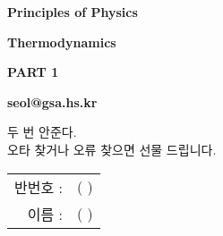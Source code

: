 \begin{titlepage}
  \centering
  \vspace*{3cm}
  
  {\Huge \textbf{Principles of Physics}} \par
  \vspace{1cm}

  {\Large \textbf{Thermodynamics}} \par
  \vspace{4pt}%
  {\Large \textbf{PART 1}} \par
  \vspace{2cm}
  
  {\Large \textbf{seol@gsa.hs.kr}} \par
  \vfill %

  {\small 두 번 안준다. \\ 오타 찾거나 오류 찾으면 선물 드립니다. \\[10pt]
  \begin{tabular}{@{}r@{ }l}
    \hspace{10cm}
    반번호 : & ( \hspace{3cm} ) \\[5pt]
    이름 : & ( \hspace{3cm} )
  \end{tabular}}

\end{titlepage}

\clearpage %